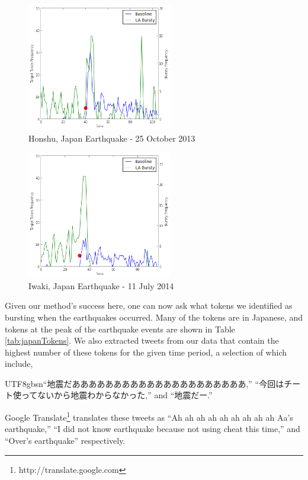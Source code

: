 \documentclass{acm_proc_article-sp}
\newcommand{\myfont}{gbsn}
\begin{document}
\begin{figure}[hbt]
\begin{center}
\includegraphics[width=2.5in]{./figures/2013-japan-quake.png}
\caption{Honshu, Japan Earthquake - 25 October 2013}
\label{fig:2013Japan}
\end{center}
\end{figure}

\begin{figure}[hbtp]
\begin{center}
\includegraphics[width=2.5in]{./figures/2014-japan-quake.png}
\caption{Iwaki, Japan Earthquake - 11 July 2014}
\label{fig:2014Japan}
\end{center}
\end{figure}

Given our method's success here, one can now ask what tokens we identified as bursting when the earthquakes occurred.
Many of the tokens are in Japanese, and tokens at the peak of the earthquake events are shown in Table \ref{tab:japanTokens}.
We also extracted tweets from our data that contain the highest number of these tokens for the given time period, a selection of which include, \begin{CJK}{UTF8}{\myfont}``地震だあああああああああああああああああああああ,'' ``今回はチート使ってないから地震わからなかった,'' and ``地震だー.'' \end{CJK}
Google Translate\footnote{http://translate.google.com} translates these tweets as ``Ah ah ah ah ah ah ah ah ah Aa's earthquake,'' ``I did not know earthquake because not using cheat this time,'' and ``Over's earthquake'' respectively.
\end{document}
